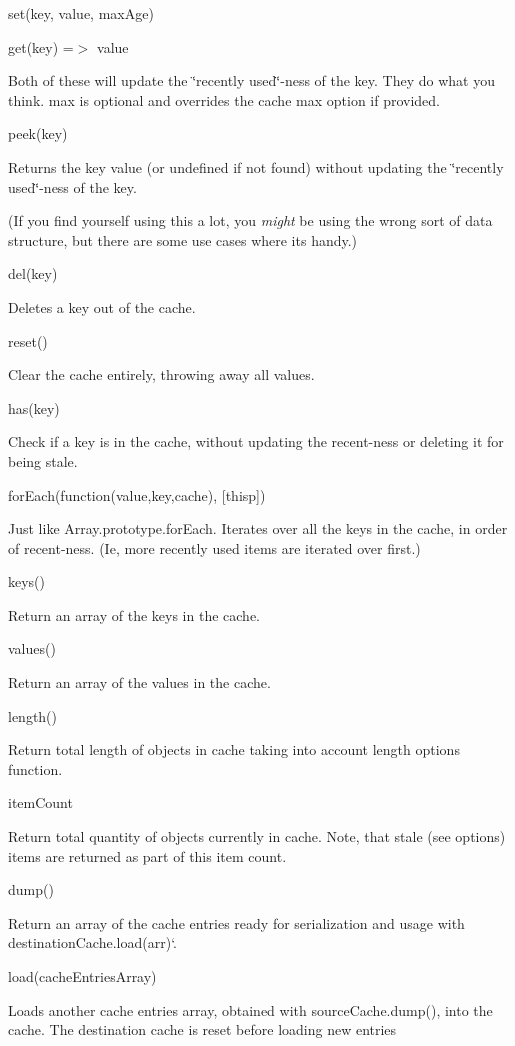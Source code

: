 \begin{DoxyItemize}
\item {\ttfamily set(key, value, max\+Age)}
\item {\ttfamily get(key) =$>$ value}

Both of these will update the \char`\"{}recently used\char`\"{}-\/ness of the key. They do what you think. {\ttfamily max} is optional and overrides the cache {\ttfamily max} option if provided.
\item {\ttfamily peek(key)}

Returns the key value (or {\ttfamily undefined} if not found) without updating the \char`\"{}recently used\char`\"{}-\/ness of the key.

(If you find yourself using this a lot, you {\itshape might} be using the wrong sort of data structure, but there are some use cases where it\textquotesingle{}s handy.)
\item {\ttfamily del(key)}

Deletes a key out of the cache.
\item {\ttfamily reset()}

Clear the cache entirely, throwing away all values.
\item {\ttfamily has(key)}

Check if a key is in the cache, without updating the recent-\/ness or deleting it for being stale.
\item {\ttfamily for\+Each(function(value,key,cache), \mbox{[}thisp\mbox{]})}

Just like {\ttfamily Array.\+prototype.\+for\+Each}. Iterates over all the keys in the cache, in order of recent-\/ness. (Ie, more recently used items are iterated over first.)
\item {\ttfamily keys()}

Return an array of the keys in the cache.
\item {\ttfamily values()}

Return an array of the values in the cache.
\item {\ttfamily length()}

Return total length of objects in cache taking into account {\ttfamily length} options function.
\item {\ttfamily item\+Count}

Return total quantity of objects currently in cache. Note, that {\ttfamily stale} (see options) items are returned as part of this item count.
\item {\ttfamily dump()}

Return an array of the cache entries ready for serialization and usage with \textquotesingle{}destination\+Cache.\+load(arr)`.
\item {\ttfamily load(cache\+Entries\+Array)}

Loads another cache entries array, obtained with {\ttfamily source\+Cache.\+dump()}, into the cache. The destination cache is reset before loading new entries 
\end{DoxyItemize}
